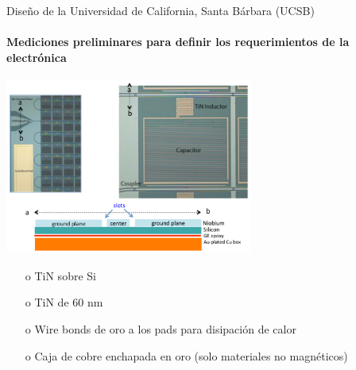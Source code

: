 \documentclass[ignorenonframetext,12pt]{beamer}
\begin{document}
\begin{frame}{Diseño de la Universidad de California, Santa Bárbara (UCSB)}
				\framesubtitle{Mediciones preliminares para definir los requerimientos
				de la electrónica}
				\centering
												\includegraphics[width=0.61\textwidth]{mkid_ucsb2}
												\footnotesize{\begin{itemize}
																\item[o] TiN sobre Si
																\item[o] TiN de 60 nm
																\item[o] Wire bonds de oro a los pads para
																				disipación de calor
																\item[o] Caja de cobre enchapada en oro (solo
																				materiales no magnéticos)

												\end{itemize}}
\end{frame}
\end{document}
